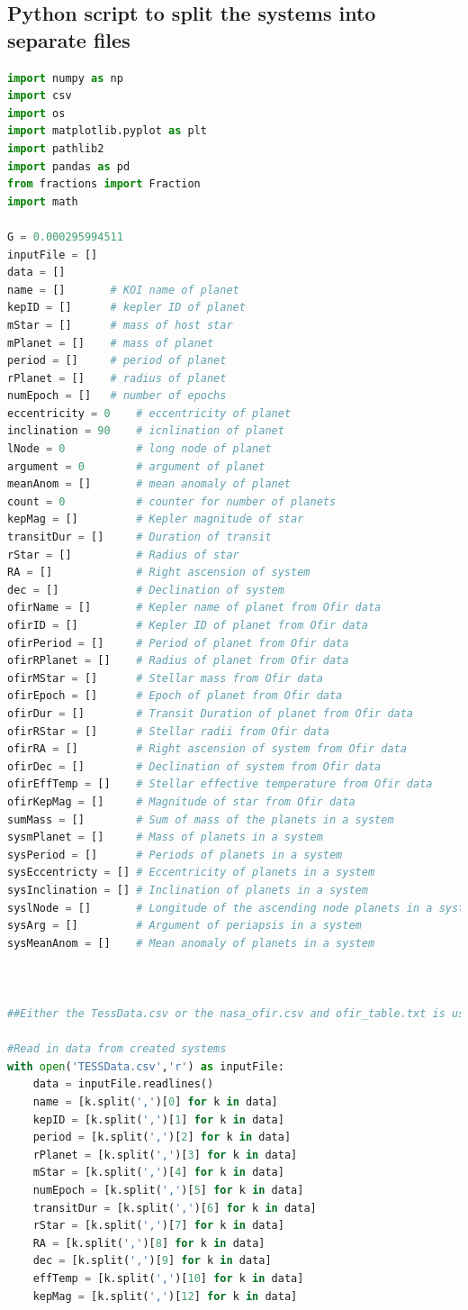 \documentclass[12pt]{report}
\begin{document}
\begin{appendix}
\chapter{Python script to split the systems into separate files}
\begin{lstlisting}[language=Python]
import numpy as np
import csv
import os
import matplotlib.pyplot as plt
import pathlib2
import pandas as pd
from fractions import Fraction  
import math

G = 0.000295994511
inputFile = []
data = []
name = [] 		# KOI name of planet
kepID = [] 		# kepler ID of planet
mStar = [] 		# mass of host star
mPlanet = [] 	# mass of planet
period = []		# period of planet
rPlanet = []	# radius of planet
numEpoch = []	# number of epochs
eccentricity = 0	# eccentricity of planet
inclination = 90	# icnlination of planet
lNode = 0			# long node of planet
argument = 0		# argument of planet
meanAnom = []		# mean anomaly of planet
count = 0			# counter for number of planets
kepMag = []			# Kepler magnitude of star
transitDur = []		# Duration of transit
rStar = []			# Radius of star
RA = []				# Right ascension of system
dec = []			# Declination of system
ofirName = []		# Kepler name of planet from Ofir data
ofirID = []			# Kepler ID of planet from Ofir data
ofirPeriod = []		# Period of planet from Ofir data
ofirRPlanet = []	# Radius of planet from Ofir data
ofirMStar = []		# Stellar mass from Ofir data
ofirEpoch = []		# Epoch of planet from Ofir data
ofirDur = []		# Transit Duration of planet from Ofir data
ofirRStar = []		# Stellar radii from Ofir data
ofirRA = []			# Right ascension of system from Ofir data
ofirDec = []		# Declination of system from Ofir data
ofirEffTemp = []	# Stellar effective temperature from Ofir data
ofirKepMag = []		# Magnitude of star from Ofir data
sumMass = []		# Sum of mass of the planets in a system
sysmPlanet = []		# Mass of planets in a system
sysPeriod = []		# Periods of planets in a system
sysEccentricty = []	# Eccentricity of planets in a system
sysInclination = []	# Inclination of planets in a system
syslNode = []		# Longitude of the ascending node planets in a system
sysArg = []			# Argument of periapsis in a system
sysMeanAnom = []	# Mean anomaly of planets in a system



##Either the TessData.csv or the nasa_ofir.csv and ofir_table.txt is used. They are not used together	
	
#Read in data from created systems
with open('TESSData.csv','r') as inputFile: 
	data = inputFile.readlines()
	name = [k.split(',')[0] for k in data]
	kepID = [k.split(',')[1] for k in data]
	period = [k.split(',')[2] for k in data]
	rPlanet = [k.split(',')[3] for k in data]
	mStar = [k.split(',')[4] for k in data]
	numEpoch = [k.split(',')[5] for k in data]
	transitDur = [k.split(',')[6] for k in data]
	rStar = [k.split(',')[7] for k in data]
	RA = [k.split(',')[8] for k in data]
	dec = [k.split(',')[9] for k in data]
	effTemp = [k.split(',')[10] for k in data]
	kepMag = [k.split(',')[12] for k in data]
	

\end{lstlisting}
\end{appendix}
\end{document}
